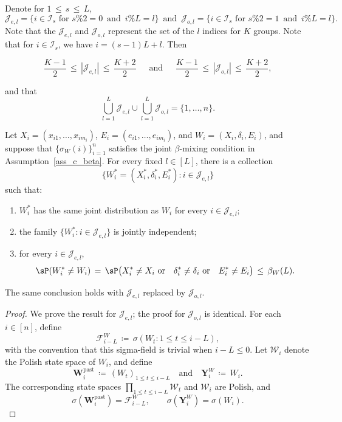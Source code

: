 \documentclass[twoside,11pt]{article}
\newenvironment{revision}{\color{revisionred}}{}
\begin{document}
Denote for \(1 \,\leq\, s \,\leq\, L\),
\[
\mathcal{J}_{e, l} = \{i \in \mathcal{I}_s \text{ for } s\%2 = 0 \,\,\,\text{and}\,\,\, i\%L = l\} \,\,\,\text{and}\,\,\, \mathcal{J}_{o, l} = \{i \in \mathcal{I}_s \text{ for } s\%2 = 1 \,\,\,\text{and}\,\,\, i\%L = l\}.
\]
Note that the $\mathcal{J}_{e, l}$ and $\mathcal{J}_{o, l}$ represent the set of the $l$ indices for $K$ groups. 
Note that for $i\in \mathcal{I}_s$, we have 
$i = (s-1)L + l$.
Then

\[
\frac{K - 1}{2} \,\leq\, |\mathcal{J}_{e, l}| \,\leq\, \frac{K + 2}{2} \quad \,\,\,\text{and}\,\,\, \quad \frac{K - 1}{2} \,\leq\, |\mathcal{J}_{o, l}| \,\leq\, \frac{K + 2}{2},
\]

and that
\[
\bigcup_{l=1}^L \mathcal{J}_{e,l} \cup \bigcup_{l=1}^L \mathcal{J}_{o,l} = \{1, \ldots, n\}.
\]

\begin{revision}
\begin{lemma}
\label{Lemma_9}
Let $X_i=(x_{i1},\dots,x_{im_i})$,
$E_i=(e_{i1},\dots,e_{im_i})$, and $W_i=(X_i,\delta_i,E_i)$, and
suppose that $\{\sigma_W(i)\}_{i=1}^n$ satisfies the joint
$\beta$-mixing condition in Assumption~\ref{ass_c_beta}. For every fixed
$l\in[L]$, there is a collection
\[
\{W_i^*=(X_i^*,\delta_i^*,E_i^*):i\in\mathcal J_{e,l}\}
\]
such that:
\begin{enumerate}
\item $W_i^*$ has the same joint distribution as $W_i$ for every
$i\in\mathcal J_{e,l}$;
\item the family $\{W_i^*:i\in\mathcal J_{e,l}\}$ is jointly
independent;
\item for every $i\in\mathcal J_{e,l}$,
\[
\sP(W_i^*\neq W_i)
\,=\,
\sP\bigl(
X_i^*\neq X_i\ \text{or}\quad
\delta_i^*\neq\delta_i\ \text{or}\quad
E_i^*\neq E_i
\bigr)
\,\leq\,\beta_W(L).
\]
\end{enumerate}
The same conclusion holds with $\mathcal J_{e,l}$ replaced by
$\mathcal J_{o,l}$.
\end{lemma}

\begin{proof}
We prove the result for $\mathcal J_{e,l}$; the proof for
$\mathcal J_{o,l}$ is identical. For each $i\in[n]$, define
\[
\mathcal F_{i-L}^W
\,\coloneqq\,
\sigma(W_t:1\leq t\leq i-L),
\]
with the convention that this sigma-field is trivial when $i-L\leq0$.
Let $\mathcal W_i$ denote the Polish state space of $W_i$, and define
\[
\mathbf W_i^{\mathrm{past}}
\,\coloneqq\,
(W_t)_{1\leq t\leq i-L}
\quad\text{and}\quad
\mathbf Y_i^W
\,\coloneqq\,
W_i.
\]
The corresponding state spaces
$\prod_{1\leq t\leq i-L}\mathcal W_t$ and $\mathcal W_i$ are Polish, and
\[
\sigma(\mathbf W_i^{\mathrm{past}})=\mathcal F_{i-L}^W,
\qquad
\sigma(\mathbf Y_i^W)=\sigma(W_i).
\]


\end{proof}
\end{revision}
\end{document}
